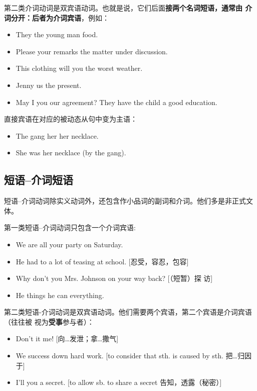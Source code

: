 第二类介词动词是双宾语动词。也就是说，它们后面\textbf{接两个名词短语，通常由
  介词分开：后者为介词宾语}，例如：

\begin{itemize}
\item They  the young man  food.
\item Please  your remarks  the matter under discussion.
\item This clothing will  you  the worst weather.
\item Jenny  us  the present.
\item May I  you  our agreement? They have 
the child  a good education.
\end{itemize}

直接宾语在对应的被动态从句中变为主语：
\begin{itemize}
\item The gang  her  her necklace.
\item She was  her necklace (by the gang).
\end{itemize}

\subsection{短语--介词短语}

短语--介词动词除实义动词外，还包含作小品词的副词和介词。他们多是非正式文体。

第一类短语--介词动词只包含一个介词宾语:
\begin{itemize}
\item We are all  your party on Saturday.

\item He had to  a lot of teasing at school. [忍受，容忍，包容]

\item Why don't you  Mrs. Johnson on your way back? [（短暂）探
访]

\item He things he can  everything.
\end{itemize}


第二类短语-介词动词是双宾语动词。他们需要两个宾语，第二个宾语是介词宾语（往往被
视为\textbf{受事}参与者）：
\begin{itemize}
\item Don't  it  me! [向…发泄；拿…撒气]

\item We  success down  hard work. [to consider that sth.
is caused by sth. 把…归因于]

\item I'll  you  a secret. [to allow sb. to share a secret
告知，透露（秘密）]
\end{itemize}

